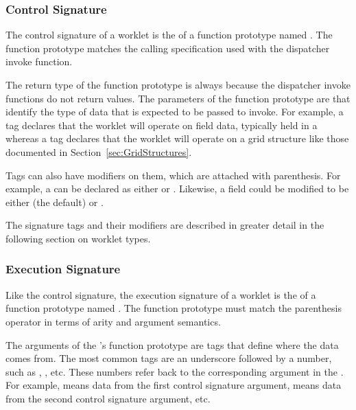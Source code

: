 \subsubsection{Control Signature}
\label{sec:ControlSignature}


The control signature of a worklet is the  of a function
prototype named \controlsignature. The function prototype matches the
calling specification used with the dispatcher invoke function.

The return type of the function prototype is always  because
the dispatcher invoke functions do not return values. The parameters of the
function prototype are  that identify
the type of data that is expected to be passed to invoke. For example, a
 tag declares that the worklet will operate on field data,
typically held in a  whereas a  tag
declares that the worklet will operate on a grid structure like those
documented in Section~\ref{sec:GridStructures}.

Tags can also have modifiers on them, which are attached with
parenthesis. For example, a  can be declared as either
 or . Likewise, a field
could be modified to be either  (the default) or
. 

The signature tags and their modifiers are described in greater detail in
the following section on worklet types.


\subsubsection{Execution Signature}
\label{sec:ExecutionSignature}


Like the control signature, the execution signature of a worklet is the
 of a function prototype named \executionsignature. The
function prototype must match the parenthesis operator in terms of arity
and argument semantics.

The arguments of the \executionsignature's function prototype are tags that
define where the data comes from. The most common tags are an underscore
followed by a number, such as , , etc. These
numbers refer back to the corresponding argument in the
\controlsignature. For example,  means data from the first
control signature argument,  means data from the second
control signature argument, etc.

